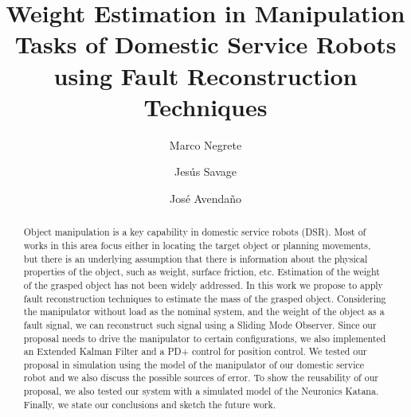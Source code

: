 \documentclass[conference,letterpaper]{ieeeconf}
\title{Weight Estimation in Manipulation Tasks of Domestic Service Robots using Fault Reconstruction Techniques}
\author{Marco Negrete \and Jesús Savage \and José Avendaño}
\begin{document}
\maketitle
\begin{abstract}
  Object manipulation is a key capability in domestic service robots (DSR). Most of works in this area focus either in locating the target object or planning movements, but there is an underlying assumption that there is information about the physical properties of the object, such as weight, surface friction, etc. Estimation of the weight of the grasped object has not been widely addressed. In this work we propose to apply fault reconstruction techniques to estimate the mass of the grasped object. Considering the manipulator without load as the nominal system, and the weight of the object as a fault signal, we can reconstruct such signal using a Sliding Mode Observer. Since our proposal needs to drive the manipulator to certain configurations, we also implemented an Extended Kalman Filter and a PD+ control for position control. We tested our proposal in simulation using the model of the manipulator of our domestic service robot and we also discuss the possible sources of error. To show the reusability of our proposal, we also tested our system with a simulated model of the Neuronics Katana. Finally, we state our conclusions and sketch the future work. 
  
\end{abstract}
\end{document}
